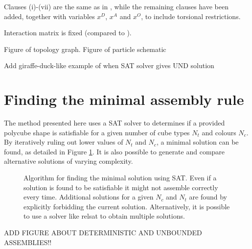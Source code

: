 Clauses (i)-(vii) are the same as in \cite{romano2020designing}, while the remaining clauses have been added, together with variables \(x^D\), \(x^A\) and \(x^O\), to include torsional restrictions.

Interaction matrix is fixed (compared to \cite{romano2020designing}).

Figure of topology graph. Figure of particle schematic

Add giraffe-duck-like example of when SAT solver gives UND solution

\section{Finding the minimal assembly rule}

The method presented here uses a SAT solver to determines if a provided polycube shape is satisfiable for a given number of cube types \(N_t\) and colours \(N_c\). By iteratively ruling out lower values of \(N_t\) and \(N_c\), a minimal solution can be found, as detailed in Figure \ref{fig:sat_alg}. It is also possible to generate and compare alternative solutions of varying complexity.

\begin{figure}
    \centering
    \resizebox{\textwidth}{!}{}
    \caption{Algorithm for finding the minimal solution using SAT. Even if a solution is found to be satisfiable it might not assemble correctly every time. Additional solutions for a given \(N_c\) and \(N_t\) are found by explicitly forbidding the current solution. Alternatively, it is possible to use a solver like relsat to obtain multiple solutions. }
    \label{fig:sat_alg}
\end{figure}
ADD FIGURE ABOUT DETERMINISTIC AND UNBOUNDED ASSEMBLIES!!


